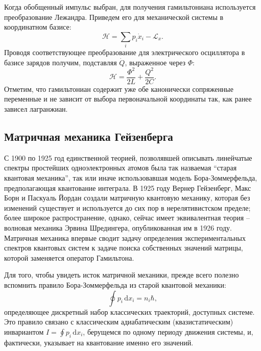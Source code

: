 \documentclass[14pt, a4paper]{extreport}
\newcommand{\diff}{\,\mathrm{d}}
\numberwithin{equation}{section}
\begin{document}
Когда обобщенный импульс выбран, для получения гамильтониана используется преобразование Лежандра. Приведем его для механической системы в координатном базисе:
\begin{equation}
	\mathcal{H} = \sum_i p_i \dot x_i - \mathcal{L}_x.
\end{equation}
Проводя соответствующее преобразование для электрического осциллятора в базисе зарядов получим, подставляя $\dot Q$, выраженное через $\Phi$:
\begin{equation}
	\mathcal{H} = \frac{\Phi^2}{2 L} + \frac{Q^2}{2C}.\label{eq:planck_electric_osc}
\end{equation}
Отметим, что гамильтониан содержит уже обе канонически сопряженные переменные и не зависит от выбора первоначальной координаты так, как ранее зависел лагранжиан.

\subsection{Матричная механика Гейзенберга}

С 1900 по 1925 год единственной теорией, позволявшей описывать линейчатые спектры простейших одноэлектронных атомов была так назваемая ``старая квантовая механика'', так или иначе использовавшая модель Бора-Зоммерфельда, предполагающая квантование интеграла. В 1925 году Вернер Гейзенберг, Макс Борн и Паскуаль Йордан создали матричную квантовую механику, которая без изменений существует и используется до сих пор в нерелятивистском пределе; более широкое распространение, однако, сейчас имеет эквивалентная теория -- волновая механика Эрвина Шредингера, опубликованная им в 1926 году. Матричная механика впервые сводит задачу определения экспериментальных спектров квантовых систем к задаче поиска собственных значений матрицы, которой заменяется оператор Гамильтона. 

Для того, чтобы увидеть исток матричной механики, прежде всего полезно вспомнить правило Бора-Зоммерфельда из старой квантовой механики:
\begin{equation}
	\oint p_i \diff x_i = n_i \hbar, \label{eq:bohr-sommerfeld}
\end{equation}
определяющее дискретный набор классических траекторий, доступных системе. Это правило связано с классическим адиабатическим (квазистатическим) инвариантом $I = \oint p_i \diff x_i$, берущемся по одному периоду движения системы, и, фактически, указывает на квантование именно его значений. 
\end{document}
